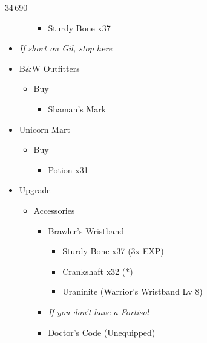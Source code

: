\begin{multicols}{2}
\begin{shop}{34\,690}
\begin{itemize}
\begin{itemize}
\begin{itemize}
                      \item Sturdy Bone x37
                    \end{itemize}
            \end{itemize}
      \item \textit{If short on Gil, stop here}
      \item B\&W Outfitters
            \begin{itemize}
              \item Buy
                    \begin{itemize}
                      \item Shaman's Mark
                    \end{itemize}
            \end{itemize}
      \item Unicorn Mart
            \begin{itemize}
              \item Buy
                    \begin{itemize}
                      \item Potion x31
                    \end{itemize}
            \end{itemize}
    \end{itemize}
  \end{shop}
  \begin{upgrade}
    \begin{itemize}
      \item Upgrade
            \begin{itemize}
              \item Accessories
                    \begin{itemize}
                      \item Brawler's Wristband
                            \begin{itemize}
                              \item Sturdy Bone x37 (3x EXP)
                              \item Crankshaft x32 (*)
                              \item Uraninite (Warrior's Wristband Lv 8)
                            \end{itemize}
                      \item \textit{If you don't have a Fortisol}
                      \item Doctor's Code (Unequipped)
                            \begin{itemize}

\end{itemize}
\end{itemize}
\end{itemize}
\end{itemize}
\end{upgrade}
\end{multicols}
